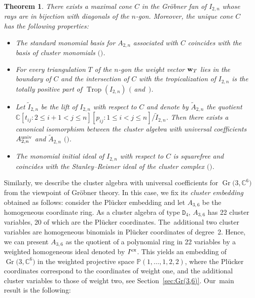 \documentclass[pdftex]{sigma}%
\newtheorem{Theorem}{Theorem}[section]
\numberwithin{equation}{section}
\DeclareMathOperator{\Gr}{Gr}
\DeclareMathOperator{\trop}{Trop}
\begin{document}
\begin{Theorem}
There exists a maximal cone $C$ in the Gr\"obner fan of $I_{2,n}$ whose rays are in bijection with diagonals of the $n$-gon. Moreover, the unique cone $C$ has the following properties:
\begin{itemize}\itemsep=0pt
 \item[$(i)$] The standard monomial basis for $A_{2,n}$ associated with $C$ coincides with the basis of cluster monomials $($$)$.
 \item[$(ii)$] For every triangulation $T$ of the $n$-gon the weight vector ${\bf w}_T$ lies in the boundary of $C$ and the intersection of $C$ with the tropicalization of $I_{2,n}$ is the totally positive part of $\trop(I_{2,n})$ $($ and~$)$.
 \item[$(iii)$] Let $\tilde I_{2,n}$ be the lift of $I_{2,n}$ with respect to $C$ and denote by $\tilde A_{2,n}$ the quotient $\mathbb C[t_{ij}\colon 2\le i+1<j\le n][p_{ij}\colon 1\le i<j\le n]/\tilde I_{2,n}$.
 Then there exists a canonical isomorphism between the cluster algebra with universal coefficients $A_{2,n}^{\rm univ}$ and $\tilde A_{2,n}$ $($$)$.
 \item[$(iv)$] The monomial initial ideal of $I_{2,n}$ with respect to $C$ is squarefree and coincides with the Stanley--Reisner ideal of the cluster complex $($$)$.
\end{itemize}
\end{Theorem}

Similarly, we describe the cluster algebra with universal coefficients for $\Gr\big(3,\mathbb C^6\big)$ from the viewpoint of Gr\"obner theory.
In this case, we fix its {\it cluster embedding} obtained as follows: consider the Pl\"ucker embedding and let $A_{3,6}$ be the homogeneous coordinate ring.
As a cluster algebra of type $\mathtt D_4$, $A_{3,6}$ has 22 cluster variables, 20 of which are the Pl\"ucker coordinates.
The~addi\-tional two cluster variables are homogeneous binomials in Pl\"ucker coordinates of deg\-ree~2.
Hence, we can present $A_{3,6}$ as the quotient of a polynomial ring in 22 variables by a weighted homogeneous ideal denoted by $I^{\rm ex}$.
This yields an embedding of $\Gr\big(3,\mathbb C^6\big)$ in the weighted projective space $\mathbb P(1,\dots,1,2,2)$, where the Pl\"ucker coordinates correspond to the coordinates of weight one, and the additional cluster variables to those of weight two, see Section~\ref{sec:Gr(3,6)}.
Our~main result is the following:
\end{document}
